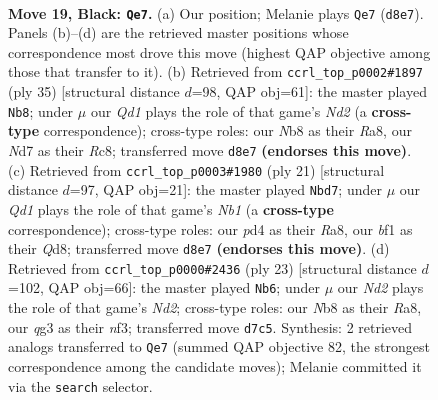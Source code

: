 \documentclass[11pt]{article}
\begin{document}
\clearpage

\begin{figure}[p]\centering
\begin{subfigure}{0.46\textwidth}\centering
\resizebox{\linewidth}{!}{%
\newchessgame
\chessboard[
  setfen={rnbqr3/2pn1kpp/1p2p3/p2pPp2/3P1P1P/P5Q1/1PPKN1P1/1R3BNR b - - 0 19},
  showmover=false,
  pgfstyle=straightmove, color=movearrow, markmove={d8-e7}
]}
\caption{}
\end{subfigure}\hfill
\begin{subfigure}{0.46\textwidth}\centering
\resizebox{\linewidth}{!}{%
\newchessgame
\chessboard[
  setfen={r1r2nk1/pp1nbpp1/1q2p2p/3pP3/P2P3P/3Q1NP1/1PN2PK1/R1BR4 b - - 4 18},
  showmover=false,
  pgfstyle=straightmove, color=movearrow, markmove={d7-b8}
]}
\caption{}
\end{subfigure}
\\[4pt]
\begin{subfigure}{0.46\textwidth}\centering
\resizebox{\linewidth}{!}{%
\newchessgame
\chessboard[
  setfen={rn1q1rk1/1b3ppp/1p1ppn2/p7/1pPP4/3Q1NP1/PP1NPPBP/R2R2K1 b - - 3 11},
  showmover=false,
  pgfstyle=straightmove, color=movearrow, markmove={b8-d7}
]}
\caption{}
\end{subfigure}\hfill
\begin{subfigure}{0.46\textwidth}\centering
\resizebox{\linewidth}{!}{%
\newchessgame
\chessboard[
  setfen={r1b2rk1/1p1nqppp/p1n1p3/3pP3/3P1P1P/5N2/PP2N1P1/R2QKB1R b KQ - 0 12},
  showmover=false,
  pgfstyle=straightmove, color=movearrow, markmove={d7-b6}
]}
\caption{}
\end{subfigure}
\caption{\textbf{Move 19, Black: \texttt{Qe7}.} (a) Our position; Melanie plays \texttt{Qe7} (\texttt{d8e7}). Panels (b)--(d) are the retrieved master positions whose correspondence most drove this move (highest QAP objective among those that transfer to it). (b) Retrieved from \texttt{ccrl\_top\_p0002\#1897} (ply 35) [structural distance $d$=98, QAP obj=61]: the master played \texttt{Nb8}; under $\mu$ our \emph{Qd1} plays the role of that game's \emph{Nd2} (a \textbf{cross-type} correspondence); cross-type roles: our \emph{N}b8 as their \emph{R}a8, our \emph{N}d7 as their \emph{R}c8; transferred move \texttt{d8e7} \textbf{(endorses this move)}. (c) Retrieved from \texttt{ccrl\_top\_p0003\#1980} (ply 21) [structural distance $d$=97, QAP obj=21]: the master played \texttt{Nbd7}; under $\mu$ our \emph{Qd1} plays the role of that game's \emph{Nb1} (a \textbf{cross-type} correspondence); cross-type roles: our \emph{p}d4 as their \emph{R}a8, our \emph{b}f1 as their \emph{Q}d8; transferred move \texttt{d8e7} \textbf{(endorses this move)}. (d) Retrieved from \texttt{ccrl\_top\_p0000\#2436} (ply 23) [structural distance $d$=102, QAP obj=66]: the master played \texttt{Nb6}; under $\mu$ our \emph{Nd2} plays the role of that game's \emph{Nd2}; cross-type roles: our \emph{N}b8 as their \emph{R}a8, our \emph{q}g3 as their \emph{n}f3; transferred move \texttt{d7c5}. Synthesis: 2 retrieved analogs transferred to \texttt{Qe7} (summed QAP objective 82, the strongest correspondence among the candidate moves); Melanie committed it via the \texttt{search} selector.}
\label{fig:thought-m37}
\end{figure}
\end{document}
